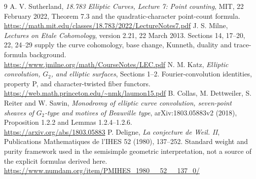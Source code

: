 \documentclass[11pt,a4paper]{article}
\numberwithin{equation}{section}
\begin{document}
\clearpage
\begin{thebibliography}{9}\small
{} A. V. Sutherland, \emph{18.783 Elliptic Curves, Lecture 7: Point counting}, MIT, 22 February 2022, Theorem 7.3 and the quadratic-character point-count formula.\\
\url{https://math.mit.edu/classes/18.783/2022/LectureNotes7.pdf}
 J. S. Milne, \emph{Lectures on Etale Cohomology}, version 2.21, 22 March 2013. Sections 14, 17--20, 22, 24--29 supply the curve cohomology, base change, Kunneth, duality and trace-formula background.\\
\url{https://www.jmilne.org/math/CourseNotes/LEC.pdf}
 N. M. Katz, \emph{Elliptic convolution, $G_2$, and elliptic surfaces}, Sections 1--2. Fourier-convolution identities, property P, and character-twisted fiber functors.\\
\url{https://web.math.princeton.edu/~nmk/laumon15.pdf}
 B. Collas, M. Dettweiler, S. Reiter and W. Sawin, \emph{Monodromy of elliptic curve convolution, seven-point sheaves of $G_2$-type and motives of Beauville type}, arXiv:1803.05883v2 (2018), Proposition 1.2.2 and Lemmas 1.2.4--1.2.6.\\
\url{https://arxiv.org/abs/1803.05883}
 P. Deligne, \emph{La conjecture de Weil. II}, Publications Mathematiques de l'IHES 52 (1980), 137--252. Standard weight and purity framework used in the semisimple geometric interpretation, not a source of the explicit formulas derived here.\\
\url{https://www.numdam.org/item/PMIHES_1980__52__137_0/}
\end{thebibliography}
\end{document}

